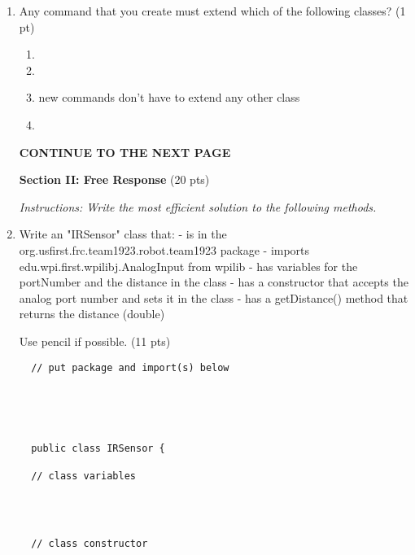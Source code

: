 \documentclass[11pt,fleqn]{article}
\begin{document}
\begin{enumerate}
\item Any command that you create must extend which of the following classes? (1 pt)
	\begin{enumerate}
	\item {}
	\item {}
	\item new commands don't have to extend any other class
	\item {}
	\end{enumerate}

  \vfill
  \begin{center}
  \textbf{CONTINUE TO THE NEXT PAGE}
  \end{center}

	\newpage

  \begin{center}
  \begin{large}
    \textbf{Section II: Free Response} (20 pts)
  \end{large}
  \end{center}
  \textit{Instructions: Write the most efficient solution to the following methods.}

\item Write an "IRSensor" class that: \newline %
- is in the org.usfirst.frc.team1923.robot.team1923 package \newline
- imports edu.wpi.first.wpilibj.AnalogInput from wpilib \newline
- has variables for the portNumber and the distance in the class \newline
- has a constructor that accepts the analog port number and sets it in the class \newline
- has a getDistance() method that returns the distance (double)

Use pencil if possible.  (11 pts)

  \begin{verbatim}
  // put package and import(s) below





  public class IRSensor {

  // class variables




  // class constructor









\end{verbatim}
\end{enumerate}
\end{document}
